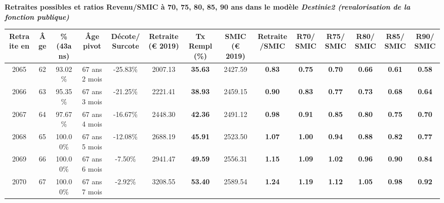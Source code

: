  \vspace{0.1cm} 
{\bf \noindent Retraites possibles et ratios Revenu/SMIC à 70, 75, 80, 85, 90 ans dans le modèle \emph{Destinie2 (revalorisation de la fonction publique)}}  
 
\begin{adjustbox}{max width=\textwidth} 
\begin{tabular}[htb]{|c|c||c|c|c||c|c||c|c||c|c|c|c|c|} 
\hline 
 Retraite en &  Âge &  \%(43ans) &  Âge pivot &  Décote/Surcote &  Retraite (\euro{} 2019) &  Tx Rempl(\%) &  SMIC (\euro{} 2019) &  Retraite/SMIC &  R70/SMIC &  R75/SMIC &  R80/SMIC &  R85/SMIC &  R90/SMIC \\ 
\hline \hline 
 2065 &  62 &  93.02\% &  67 ans 2 mois &  -25.83\% &  2007.13 &  {\bf 35.63} &  2427.59 &  {\bf {\color{red} 0.83}} &  {\bf {\color{red} 0.75}} &  {\bf {\color{red} 0.70}} &  {\bf {\color{red} 0.66}} &  {\bf {\color{red} 0.61}} &  {\bf {\color{red} 0.58}} \\ 
\hline 
 2066 &  63 &  95.35\% &  67 ans 3 mois &  -21.25\% &  2221.41 &  {\bf 38.93} &  2459.15 &  {\bf {\color{red} 0.90}} &  {\bf {\color{red} 0.83}} &  {\bf {\color{red} 0.77}} &  {\bf {\color{red} 0.73}} &  {\bf {\color{red} 0.68}} &  {\bf {\color{red} 0.64}} \\ 
\hline 
 2067 &  64 &  97.67\% &  67 ans 4 mois &  -16.67\% &  2448.30 &  {\bf 42.36} &  2491.12 &  {\bf {\color{red} 0.98}} &  {\bf {\color{red} 0.91}} &  {\bf {\color{red} 0.85}} &  {\bf {\color{red} 0.80}} &  {\bf {\color{red} 0.75}} &  {\bf {\color{red} 0.70}} \\ 
\hline 
 2068 &  65 &  100.00\% &  67 ans 5 mois &  -12.08\% &  2688.19 &  {\bf 45.91} &  2523.50 &  {\bf 1.07} &  {\bf {\color{red} 1.00}} &  {\bf {\color{red} 0.94}} &  {\bf {\color{red} 0.88}} &  {\bf {\color{red} 0.82}} &  {\bf {\color{red} 0.77}} \\ 
\hline 
 2069 &  66 &  100.00\% &  67 ans 6 mois &  -7.50\% &  2941.47 &  {\bf 49.59} &  2556.31 &  {\bf 1.15} &  {\bf 1.09} &  {\bf 1.02} &  {\bf {\color{red} 0.96}} &  {\bf {\color{red} 0.90}} &  {\bf {\color{red} 0.84}} \\ 
\hline 
 2070 &  67 &  100.00\% &  67 ans 7 mois &  -2.92\% &  3208.55 &  {\bf 53.40} &  2589.54 &  {\bf 1.24} &  {\bf 1.19} &  {\bf 1.12} &  {\bf 1.05} &  {\bf {\color{red} 0.98}} &  {\bf {\color{red} 0.92}} \\ 
\hline 
\hline 
\end{tabular} 
\end{adjustbox} 
 
